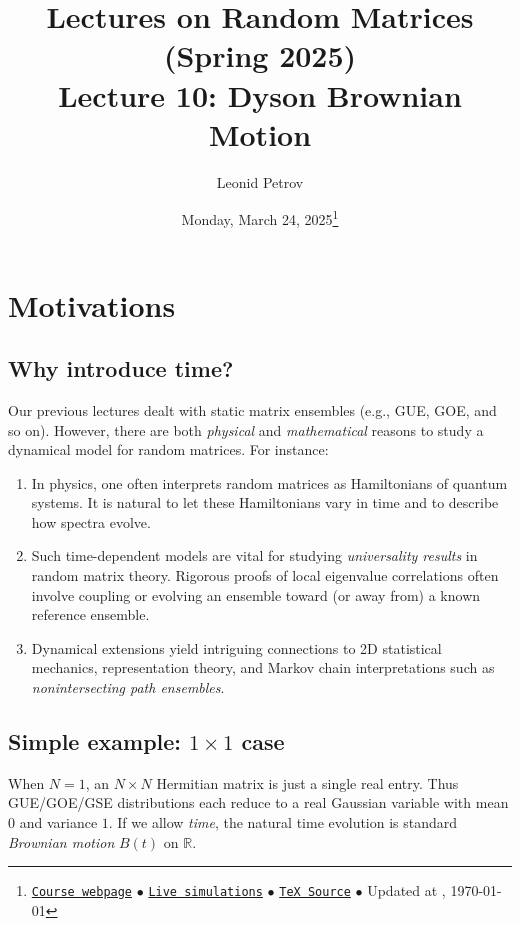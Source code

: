 \documentclass[letterpaper,11pt,oneside,reqno]{article}
\numberwithin{equation}{section}
\theoremstyle{definition}
\begin{document}
\title{Lectures on Random Matrices
(Spring 2025)
\\Lecture 10: Dyson Brownian Motion}


\date{Monday, March 24, 2025\footnote{\href{https://lpetrov.cc/rmt25/}{\texttt{Course webpage}}
$\bullet$ \href{https://lpetrov.cc/simulations/model/random-matrices/}{\texttt{Live simulations}}
$\bullet$ \href{https://lpetrov.cc/rmt25/rmt25-notes/rmt2025-l10.tex}{\texttt{TeX Source}}
$\bullet$
Updated at \currenttime, \today}}



\author{Leonid Petrov}


\maketitle


\section{Motivations}
\subsection{Why introduce time?}
Our previous lectures dealt with static matrix ensembles (e.g., GUE, GOE, and so on). However, there are both \emph{physical} and \emph{mathematical} reasons to study a dynamical model for random matrices. For instance:
\begin{enumerate}
\item In physics, one often interprets random matrices as Hamiltonians of quantum systems. It is natural to let these Hamiltonians vary in time and to describe how spectra evolve.
\item Such time-dependent models are vital for studying \emph{universality results} in random matrix theory. Rigorous proofs of local eigenvalue correlations often involve coupling or evolving an ensemble toward (or away from) a known reference ensemble.
\item Dynamical extensions yield intriguing connections to 2D statistical mechanics, representation theory, and Markov chain interpretations such as \emph{nonintersecting path ensembles}.
\end{enumerate}

\subsection{Simple example: $1\times1$ case}
When $N=1$, an $N\times N$ Hermitian matrix is just a single real entry. Thus GUE/GOE/GSE distributions each reduce to a real Gaussian variable with mean $0$ and variance $1$. If we allow \emph{time}, the natural time evolution is standard \emph{Brownian motion} $B(t)$ on $\mathbb{R}$.
\end{document}
